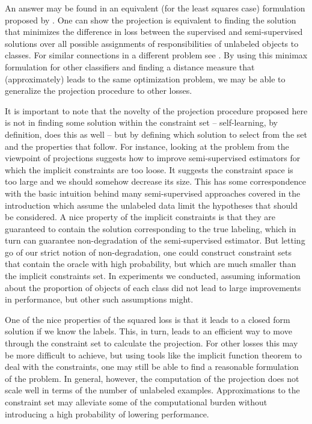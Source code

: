 \documentclass[twoside]{memoir}\usepackage[]{graphicx}\usepackage{xcolor}
\begin{document}
An answer may be found in an equivalent (for the least squares case) formulation proposed by \citet{Loog2016}. One can show the projection is equivalent to finding the solution that minimizes the difference in loss between the supervised and semi-supervised solutions over all possible assignments of responsibilities of unlabeled objects to classes. For similar connections in a different problem see \citet{Arnold2000}. By using this minimax formulation for other classifiers and finding a distance measure that (approximately) leads to the same optimization problem, we may be able to generalize the projection procedure to other losses.

It is important to note that the novelty of the projection procedure proposed here is not in finding some solution within the constraint set -- self-learning, by definition, does this as well -- but by defining which solution to select from the set and the properties that follow. For instance, looking at the problem from the viewpoint of projections suggests how to improve semi-supervised estimators for which the implicit constraints are too loose. It suggests the constraint space is too large and we should somehow decrease its size. This has some correspondence with the basic intuition behind many semi-supervised approaches covered in the introduction which assume the unlabeled data limit the hypotheses that should be considered. A nice property of the implicit constraints is that they are guaranteed to contain the solution corresponding to the true labeling, which in turn can guarantee non-degradation of the semi-supervised estimator. But letting go of our strict notion of non-degradation, one could construct constraint sets that contain the oracle with high probability, but which are much smaller than the implicit constraints set. In experiments we conducted, assuming information about the proportion of objects of each class did not lead to large improvements in performance, but other such assumptions might.

One of the nice properties of the squared loss is that it leads to a closed form solution if we know the labels. This, in turn, leads to an efficient way to move through the constraint set to calculate the projection. For other losses this may be more difficult to achieve, but using tools like the implicit function theorem to deal with the constraints, one may still be able to find a reasonable formulation of the problem. In general, however, the computation of the projection does not scale well in terms of the number of unlabeled examples. Approximations to the constraint set may alleviate some of the computational burden without introducing a high probability of lowering performance.
\end{document}

